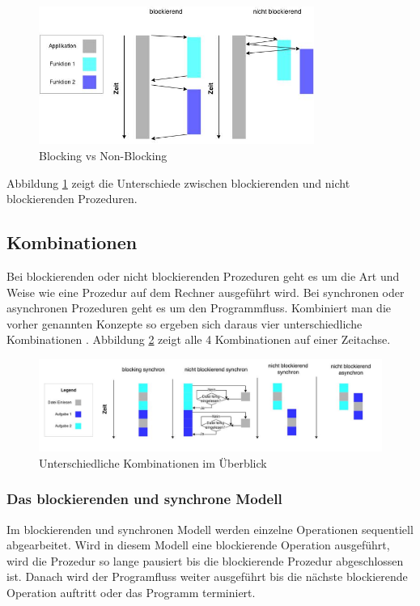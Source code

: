 \begin{figure}[!htb]
  \centering
  \includegraphics[width=9cm]{images/blocking_vs_nonblocking.jpg}
  \caption{
    Blocking vs Non-Blocking
  }
  \label{figure:blocking_vs_non_blocking}
\end{figure}

Abbildung \ref{figure:blocking_vs_non_blocking} zeigt die Unterschiede zwischen blockierenden und nicht blockierenden Prozeduren.

\subsection{Kombinationen}
Bei blockierenden oder nicht blockierenden Prozeduren geht es um die Art und Weise wie eine Prozedur auf dem Rechner ausgeführt wird. Bei synchronen oder asynchronen Prozeduren geht es um den Programmfluss. Kombiniert man die vorher genannten Konzepte so ergeben sich daraus vier unterschiedliche Kombinationen \cite[p. 48]{Erb2012}. Abbildung \ref{figure:synchron_blocking} zeigt alle 4 Kombinationen auf einer Zeitachse. 

\begin{figure}[!htb]
  \centering
  \includegraphics[width=16cm]{images/synchron_blocking.jpg}
  \caption{
    Unterschiedliche Kombinationen im Überblick
  }
  \label{figure:synchron_blocking}
\end{figure}

\subsubsection{Das blockierenden und synchrone Modell}
Im blockierenden und synchronen Modell werden einzelne Operationen sequentiell abgearbeitet. Wird in diesem Modell eine blockierende Operation ausgeführt, wird die Prozedur so lange pausiert bis die blockierende Prozedur abgeschlossen ist. Danach wird der Programfluss weiter ausgeführt bis die nächste blockierende Operation auftritt oder das Programm terminiert.

